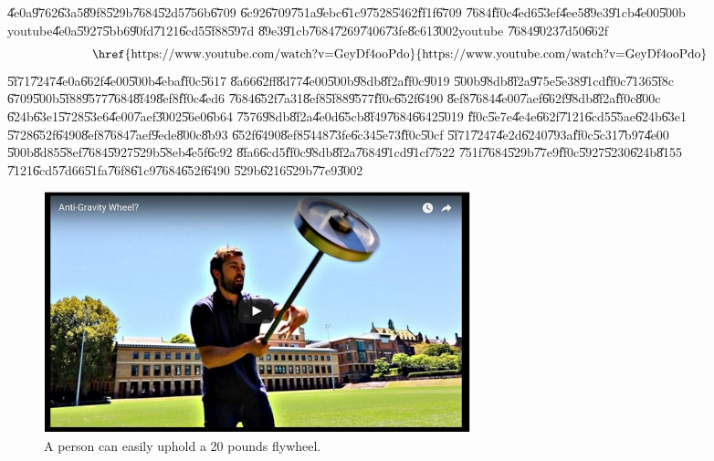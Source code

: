 \U{4e0a}\U{9762}\U{63a5}\U{89f8}\U{529b}\U{7684}\U{52d5}\U{756b}\U{6709}%
\U{6c92}\U{6709}\U{751a}\U{9ebc}\U{61c9}\U{7528}\U{5462}\U{ff1f}\U{6709}%
\U{7684}\U{ff0c}\U{4ed6}\U{53ef}\U{4ee5}\U{89e3}\U{91cb}\U{4e00}\U{500b}%
youtube\U{4e0a}\U{5927}\U{5bb6}\U{90fd}\U{7121}\U{6cd5}\U{5f88}\U{597d}%
\U{89e3}\U{91cb}\U{7684}\U{7269}\U{7406}\U{73fe}\U{8c61}\U{3002}youtube%
\U{7684}\U{9023}\U{7d50}\U{662f}%
\begin{equation*}
\text{\href{https://www.youtube.com/watch?v=GeyDf4ooPdo}{%
https://www.youtube.com/watch?v=GeyDf4ooPdo}}
\end{equation*}%
\U{5f71}\U{7247}\U{4e0a}\U{662f}\U{4e00}\U{500b}\U{4eba}\U{ff0c}\U{5617}%
\U{8a66}\U{62ff}\U{8d77}\U{4e00}\U{500b}\U{98db}\U{8f2a}\U{ff0c}\U{9019}%
\U{500b}\U{98db}\U{8f2a}\U{975e}\U{5e38}\U{91cd}\U{ff0c}\U{7136}\U{5f8c}%
\U{6709}\U{500b}\U{5f88}\U{9577}\U{7684}\U{8f49}\U{8ef8}\U{ff0c}\U{4ed6}%
\U{7684}\U{652f}\U{7a31}\U{8ef8}\U{5f88}\U{9577}\U{ff0c}\U{652f}\U{6490}%
\U{8ef8}\U{7684}\U{4e00}\U{7aef}\U{662f}\U{98db}\U{8f2a}\U{ff0c}\U{800c}%
\U{624b}\U{63e1}\U{5728}\U{53e6}\U{4e00}\U{7aef}\U{3002}\U{56e0}\U{6b64}%
\U{7576}\U{98db}\U{8f2a}\U{4e0d}\U{65cb}\U{8f49}\U{7684}\U{6642}\U{5019}%
\U{ff0c}\U{5e7e}\U{4e4e}\U{662f}\U{7121}\U{6cd5}\U{55ae}\U{624b}\U{63e1}%
\U{5728}\U{652f}\U{6490}\U{8ef8}\U{7684}\U{7aef}\U{9ede}\U{800c}\U{8b93}%
\U{652f}\U{6490}\U{8ef8}\U{5448}\U{73fe}\U{6c34}\U{5e73}\U{ff0c}\U{50cf}%
\U{5f71}\U{7247}\U{4e2d}\U{6240}\U{793a}\U{ff0c}\U{5c31}\U{7b97}\U{4e00}%
\U{500b}\U{8d85}\U{58ef}\U{7684}\U{5927}\U{529b}\U{58eb}\U{4e5f}\U{6c92}%
\U{8fa6}\U{6cd5}\U{ff0c}\U{98db}\U{8f2a}\U{7684}\U{91cd}\U{91cf}\U{7522}%
\U{751f}\U{7684}\U{529b}\U{77e9}\U{ff0c}\U{5927}\U{5230}\U{624b}\U{8155}%
\U{7121}\U{6cd5}\U{7d66}\U{51fa}\U{76f8}\U{61c9}\U{7684}\U{652f}\U{6490}%
\U{529b}\U{6216}\U{529b}\U{77e9}\U{3002}

\begin{figure}[th]
\caption{A person can easily uphold a 20 pounds flywheel.}
\begin{center}
\includegraphics[width=0.6\textwidth]{./figs/hercules.png}
\end{center}
\end{figure}

